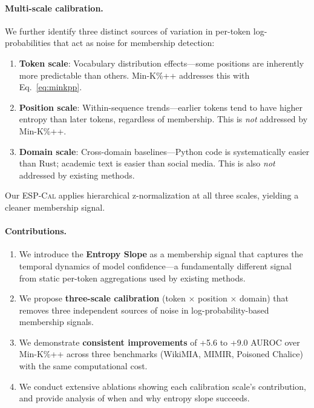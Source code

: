 \documentclass[11pt]{article}
\newcommand{\ours}{\textsc{ESP-Cal}}
\begin{document}
\paragraph{Multi-scale calibration.}
We further identify three distinct sources of variation in per-token log-probabilities that act as noise for membership detection:
\begin{enumerate}
    \item \textbf{Token scale}: Vocabulary distribution effects---some positions are inherently more predictable than others. Min-K\%++ addresses this with Eq.~\ref{eq:minkpp}.
    \item \textbf{Position scale}: Within-sequence trends---earlier tokens tend to have higher entropy than later tokens, regardless of membership. This is \textit{not} addressed by Min-K\%++.
    \item \textbf{Domain scale}: Cross-domain baselines---Python code is systematically easier than Rust; academic text is easier than social media. This is also \textit{not} addressed by existing methods.
\end{enumerate}

Our \ours{} applies hierarchical z-normalization at all three scales, yielding a cleaner membership signal.

\paragraph{Contributions.}
\begin{enumerate}
    \item We introduce the \textbf{Entropy Slope} as a membership signal that captures the temporal dynamics of model confidence---a fundamentally different signal from static per-token aggregations used by existing methods.
    \item We propose \textbf{three-scale calibration} (token $\times$ position $\times$ domain) that removes three independent sources of noise in log-probability-based membership signals.
    \item We demonstrate \textbf{consistent improvements} of +5.6 to +9.0 AUROC over Min-K\%++ across three benchmarks (WikiMIA, MIMIR, Poisoned Chalice) with the same computational cost.
    \item We conduct extensive ablations showing each calibration scale's contribution, and provide analysis of when and why entropy slope succeeds.
\end{enumerate}

\end{document}
